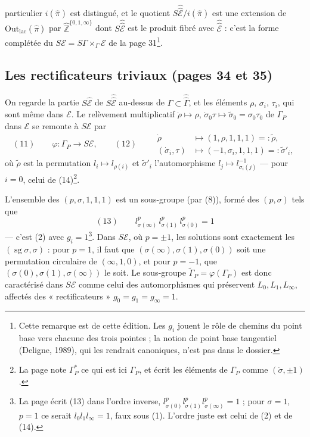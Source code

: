 \documentclass[11pt,a4paper]{article}
\begin{document}
particulier $i(\widehat{\pi})$ est distingué, et le quotient
$S\hat{\hat{\mathcal{E}}}/i(\widehat{\pi})$ est une extension de
$\mathrm{Out}_{\mathrm{lac}}(\widehat{\pi})$ par
$\widehat{\mathbb{Z}}^{\{0,1,\infty\}}$ dont $S\hat{\hat{\mathcal{E}}}$ est le
produit fibré avec $\hat{\hat{\mathcal{E}}}$ : c'est la forme complétée du
$S\mathcal{E} = S\Gamma \times_\Gamma \mathcal{E}$ de la page 31\footnote{Cette
remarque est de cette édition. Les $g_i$ jouent le rôle de chemins du point
base vers chacune des trois pointes ; la notion de point base tangentiel
(Deligne, 1989), qui les rendrait canoniques, n'est pas dans le dossier.}.

\subsection*{Les rectificateurs triviaux (pages 34 et 35)}

On regarde la partie $S\widehat{\mathcal{E}}$ de $S\hat{\hat{\mathcal{E}}}$ au-dessus
de $\Gamma \subset \hat{\hat\Gamma}$, et les éléments $\rho$, $\sigma_i$, $\tau_i$,
qui sont même dans $\mathcal{E}$. Le relèvement multiplicatif $\dot\rho \mapsto
\rho$, $\dot\sigma_0\tau \mapsto \tilde\sigma_0 = \sigma_0\tau_0$ de $\Gamma_P$
dans $\mathcal{E}$ se remonte à $S\mathcal{E}$ par
\[
(11)\qquad \varphi : \Gamma_P \longrightarrow S\mathcal{E}, \qquad
(12)\qquad
\begin{aligned}
\dot\rho &\longmapsto (1, \rho, 1, 1, 1) =: \tilde\rho,\\
(\dot\sigma_i, \tau) &\longmapsto (-1, \sigma_i, 1, 1, 1) =: \tilde\sigma'_i ,
\end{aligned}
\]
où $\tilde\rho$ est la permutation $l_i \mapsto l_{\rho(i)}$ et
$\tilde\sigma'_i$ l'automorphisme $l_j \mapsto l_{\sigma_i(j)}^{-1}$ — pour
$i = 0$, celui de (14)\footnote{La page note $\Gamma^{*}_P$ ce qui est ici
$\Gamma_P$, et écrit les éléments de $\Gamma_P$ comme $(\dot\sigma, \pm 1)$.}.

L'ensemble des $(p, \sigma, 1, 1, 1)$ est un sous-groupe (par (8)), formé des
$(p, \sigma)$ tels que
\[
(13)\qquad l_{\sigma(\infty)}^{p}\, l_{\sigma(1)}^{p}\, l_{\sigma(0)}^{p} = 1
\]
— c'est (2) avec $g_i = 1$\footnote{La page écrit (13) dans l'ordre inverse,
$l_{\sigma(0)}^{p} l_{\sigma(1)}^{p} l_{\sigma(\infty)}^{p} = 1$ ; pour $\sigma
= 1$, $p = 1$ ce serait $l_0 l_1 l_\infty = 1$, faux sous (1). L'ordre juste est
celui de (2) et de (14).}. Dans $S\mathcal{E}$, où $p = \pm 1$, les solutions
sont exactement les $(\operatorname{sg}\sigma, \sigma)$ : pour $p = 1$, il faut
que $(\sigma(\infty), \sigma(1), \sigma(0))$ soit une permutation circulaire de
$(\infty, 1, 0)$, et pour $p = -1$, que $(\sigma(0), \sigma(1),
\sigma(\infty))$ le soit. Le sous-groupe $\tilde\Gamma_P = \varphi(\Gamma_P)$
est donc caractérisé dans $S\mathcal{E}$ comme celui des automorphismes qui
préservent $L_0, L_1, L_\infty$, affectés des « rectificateurs » $g_0 = g_1 =
g_\infty = 1$.
\end{document}
